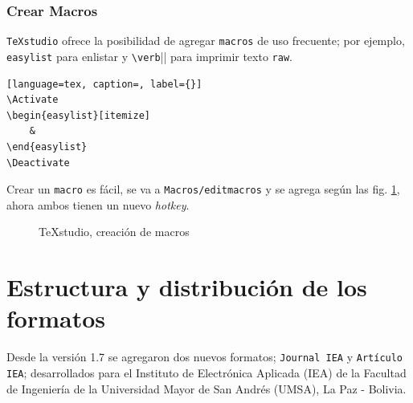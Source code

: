 \subsubsection{Crear Macros}
\verb|TeXstudio| ofrece la posibilidad de agregar \verb|macros| de uso frecuente; por ejemplo, \verb|easylist| para enlistar y \verb|\verb||| para imprimir texto \verb|raw|.
\begin{lstlisting}[language=tex, caption=, label={}]
\Activate
\begin{easylist}[itemize]	
	& 	
\end{easylist}
\Deactivate
\end{lstlisting}
Crear un \verb|macro| es fácil, se va a \verb|Macros/editmacros| y se agrega según las fig. \ref{fig:TeXstudioMacros}, ahora ambos tienen un nuevo \textit{hotkey}. 

\begin{figure}[H]
	\centering
	\caption{TeXstudio, creación de macros}
	\label{fig:TeXstudioMacros}
\end{figure}
	
\section{Estructura y distribución de los formatos}
Desde la versión 1.7 se agregaron dos nuevos formatos; \verb|Journal IEA| y \verb|Artículo IEA|; desarrollados para el Instituto de Electrónica Aplicada (IEA) de la Facultad de Ingeniería de la Universidad Mayor de San Andrés (UMSA), La Paz - Bolivia.

